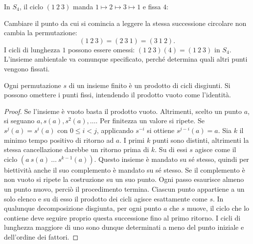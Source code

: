 \begin{esempio}
In $S_4$, il ciclo $(1\ 2\ 3)$ manda $1\mapsto2\mapsto3\mapsto1$ e fissa $4$:
\begin{center}
\end{center}
Cambiare il punto da cui si comincia a leggere la stessa successione circolare non cambia la permutazione:
\[
(1\ 2\ 3)=(2\ 3\ 1)=(3\ 1\ 2).
\]
I cicli di lunghezza $1$ possono essere omessi: $(1\ 2\ 3)(4)=(1\ 2\ 3)$ in $S_4$. L'insieme ambientale va comunque specificato, perché determina quali altri punti vengono fissati.
\end{esempio}

\begin{teorema}
Ogni permutazione $s$ di un insieme finito è un prodotto di cicli disgiunti. Si possono omettere i punti fissi, intendendo il prodotto vuoto come l'identità.
\end{teorema}
\begin{proof}
Se l’insieme è vuoto basta il prodotto vuoto. Altrimenti, scelto un punto $a$, si seguano $a,s(a),s^2(a),\ldots$. Per finitezza un valore si ripete. Se $s^j(a)=s^i(a)$ con $0\le i<j$, applicando $s^{-i}$ si ottiene $s^{j-i}(a)=a$. Sia $k$ il minimo tempo positivo di ritorno ad $a$. I primi $k$ punti sono distinti, altrimenti la stessa cancellazione darebbe un ritorno prima di $k$. Su di essi $s$ agisce come il ciclo $(a\ s(a)\ \ldots\ s^{k-1}(a))$. Questo insieme è mandato su sé stesso, quindi per biettività anche il suo complemento è mandato su sé stesso. Se il complemento è non vuoto si ripete la costruzione su un suo punto. Ogni passo esaurisce almeno un punto nuovo, perciò il procedimento termina. Ciascun punto appartiene a un solo elenco e su di esso il prodotto dei cicli agisce esattamente come $s$. In qualunque decomposizione disgiunta, per ogni punto $a$ che $s$ muove, il ciclo che lo contiene deve seguire proprio questa successione fino al primo ritorno. I cicli di lunghezza maggiore di uno sono dunque determinati a meno del punto iniziale e dell’ordine dei fattori.
\end{proof}

